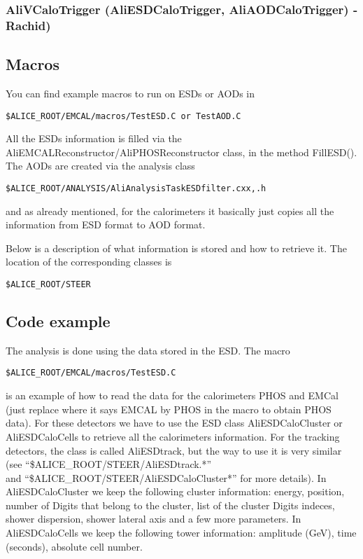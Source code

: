 \subsubsection{AliVCaloTrigger (AliESDCaloTrigger, AliAODCaloTrigger) - Rachid)}

\subsection{Macros}
You can find example macros to run on ESDs or AODs in 
\begin{lstlisting}
$ALICE_ROOT/EMCAL/macros/TestESD.C or TestAOD.C
\end{lstlisting}

 All the ESDs information is filled via the AliEMCALReconstructor/AliPHOSReconstructor class, in the method FillESD(). The AODs are created via the analysis class 

\begin{lstlisting}
$ALICE_ROOT/ANALYSIS/AliAnalysisTaskESDfilter.cxx,.h
\end{lstlisting}

and as already mentioned, for the calorimeters it basically just copies all the information from ESD format to AOD format. 

Below is a description of what information is stored and how to retrieve it. The location of the corresponding classes is
\begin{lstlisting}
$ALICE_ROOT/STEER
\end{lstlisting}



\subsection{Code example}

The analysis is done using the data stored in the ESD. The macro
\begin{lstlisting}
$ALICE_ROOT/EMCAL/macros/TestESD.C
\end{lstlisting}
is an example of how to read the data for the calorimeters PHOS and
EMCal (just replace where it says EMCAL by PHOS in the macro to obtain
PHOS data). For these detectors we have to use the ESD class AliESDCaloCluster or AliESDCaloCells to retrieve all the calorimeters information. For the tracking detectors,
the class is called AliESDtrack, but the way to use it is very similar
(see ``\$ALICE\_ROOT/STEER/AliESDtrack.*''\\ and ``\$ALICE\_ROOT/STEER/AliESDCaloCluster*'' for more details). In AliESDCaloCluster we keep the following
cluster information: energy, position, number of Digits that belong
to the cluster, list of the cluster Digits indeces, shower dispersion, shower lateral axis and a few more parameters. In AliESDCaloCells we keep the following
tower information: amplitude (GeV), time (seconds), absolute cell number.

